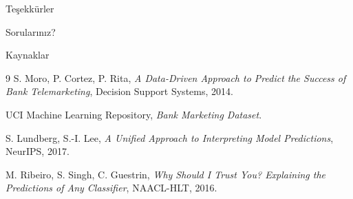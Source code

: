 \documentclass[aspectratio=169]{beamer}
\begin{document}
\begin{frame}
    \centering
    \Huge Teşekkürler

    \vspace{1cm}
    \large Sorularınız?
\end{frame}

\begin{frame}{Kaynaklar}
    \footnotesize
    \begin{thebibliography}{9}
        S. Moro, P. Cortez, P. Rita,
        \textit{A Data-Driven Approach to Predict the Success of Bank Telemarketing},
        Decision Support Systems, 2014.

        UCI Machine Learning Repository,
        \textit{Bank Marketing Dataset}.

        S. Lundberg, S.-I. Lee,
        \textit{A Unified Approach to Interpreting Model Predictions},
        NeurIPS, 2017.

        M. Ribeiro, S. Singh, C. Guestrin,
        \textit{Why Should I Trust You? Explaining the Predictions of Any Classifier},
        NAACL-HLT, 2016.
    \end{thebibliography}
\end{frame}
\end{document}
